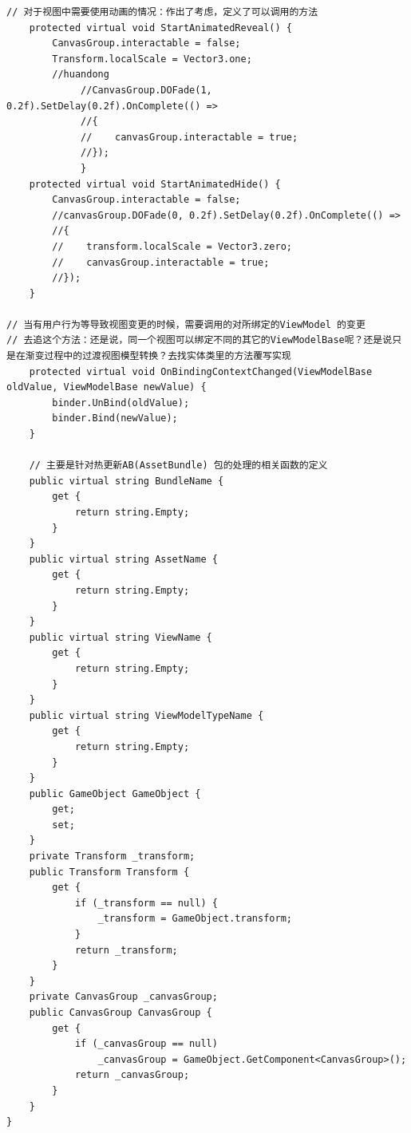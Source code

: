 \documentclass[9pt, b5paper]{article}
\begin{document}
\begin{verbatim}
// 对于视图中需要使用动画的情况：作出了考虑，定义了可以调用的方法    
    protected virtual void StartAnimatedReveal() {
        CanvasGroup.interactable = false;
        Transform.localScale = Vector3.one;
        //huandong
             //CanvasGroup.DOFade(1, 0.2f).SetDelay(0.2f).OnComplete(() =>
             //{
             //    canvasGroup.interactable = true;
             //});
             }
    protected virtual void StartAnimatedHide() {
        CanvasGroup.interactable = false;
        //canvasGroup.DOFade(0, 0.2f).SetDelay(0.2f).OnComplete(() =>
        //{
        //    transform.localScale = Vector3.zero;
        //    canvasGroup.interactable = true;
        //});
    }
    
// 当有用户行为等导致视图变更的时候，需要调用的对所绑定的ViewModel 的变更
// 去追这个方法：还是说，同一个视图可以绑定不同的其它的ViewModelBase呢？还是说只是在渐变过程中的过渡视图模型转换？去找实体类里的方法覆写实现
    protected virtual void OnBindingContextChanged(ViewModelBase oldValue, ViewModelBase newValue) {
        binder.UnBind(oldValue);
        binder.Bind(newValue);
    }

    // 主要是针对热更新AB(AssetBundle) 包的处理的相关函数的定义
    public virtual string BundleName {
        get {
            return string.Empty;
        }
    }
    public virtual string AssetName {
        get {
            return string.Empty;
        }
    }
    public virtual string ViewName {
        get {
            return string.Empty;
        }
    }
    public virtual string ViewModelTypeName {
        get {
            return string.Empty;
        }
    }
    public GameObject GameObject {
        get;
        set;
    }
    private Transform _transform;
    public Transform Transform {
        get {
            if (_transform == null) {
                _transform = GameObject.transform;
            }
            return _transform;
        }
    }
    private CanvasGroup _canvasGroup;
    public CanvasGroup CanvasGroup {
        get {
            if (_canvasGroup == null) 
                _canvasGroup = GameObject.GetComponent<CanvasGroup>();
            return _canvasGroup;
        }
    }
}
\end{verbatim}
\end{document}
